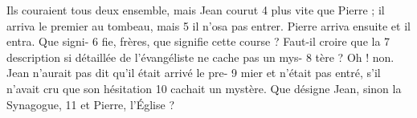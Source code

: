 Ils couraient tous deux ensemble, mais Jean courut	 
4	 	plus vite que Pierre ; il arriva le premier au tombeau, mais	 
5	 	il n'osa pas entrer. Pierre arriva ensuite et il entra. Que signi-	 
6	 	fie, frères, que signifie cette course ? Faut-il croire que la	 
7	 	description si détaillée de l'évangéliste ne cache pas un mys-	 
8	 	tère ? Oh ! non. Jean n'aurait pas dit qu'il était arrivé le pre-	 
9	 	mier et n'était pas entré, s'il n'avait cru que son hésitation	 
10	 	cachait un mystère. Que désigne Jean, sinon la Synagogue,	 
11	 	et Pierre, l'Église ?